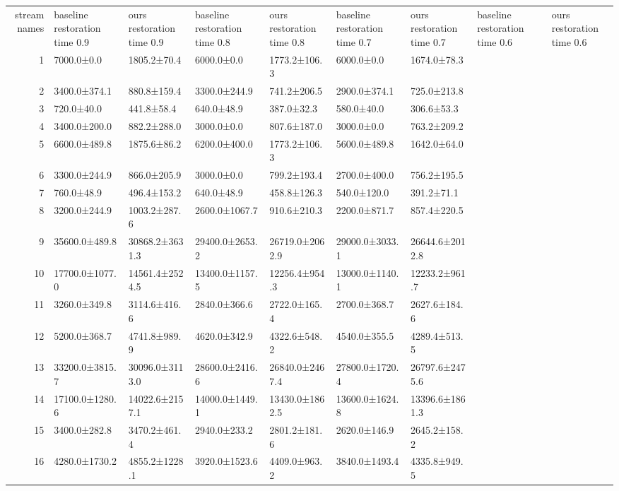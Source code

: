 \begin{tabular}{|r|l|l|l|l|l|l|l|l|}
  \hline
  stream names & baseline restoration time 0.9 & ours restoration time 0.9 & baseline restoration time 0.8 & ours restoration time 0.8 & baseline restoration time 0.7 & ours restoration time 0.7 & baseline restoration time 0.6 & ours restoration time 0.6 \\ 
  1 & 7000.0±0.0 & 1805.2±70.4 & 6000.0±0.0 & 1773.2±106.3 & 6000.0±0.0 & 1674.0±78.3 \\ 
  2 & 3400.0±374.1 & 880.8±159.4 & 3300.0±244.9 & 741.2±206.5 & 2900.0±374.1 & 725.0±213.8 \\ 
  3 & 720.0±40.0 & 441.8±58.4 & 640.0±48.9 & 387.0±32.3 & 580.0±40.0 & 306.6±53.3 \\ 
  4 & 3400.0±200.0 & 882.2±288.0 & 3000.0±0.0 & 807.6±187.0 & 3000.0±0.0 & 763.2±209.2 \\ 
  5 & 6600.0±489.8 & 1875.6±86.2 & 6200.0±400.0 & 1773.2±106.3 & 5600.0±489.8 & 1642.0±64.0 \\ 
  6 & 3300.0±244.9 & 866.0±205.9 & 3000.0±0.0 & 799.2±193.4 & 2700.0±400.0 & 756.2±195.5 \\ 
  7 & 760.0±48.9 & 496.4±153.2 & 640.0±48.9 & 458.8±126.3 & 540.0±120.0 & 391.2±71.1 \\ 
  8 & 3200.0±244.9 & 1003.2±287.6 & 2600.0±1067.7 & 910.6±210.3 & 2200.0±871.7 & 857.4±220.5 \\ 
  9 & 35600.0±489.8 & 30868.2±3631.3 & 29400.0±2653.2 & 26719.0±2062.9 & 29000.0±3033.1 & 26644.6±2012.8 \\ 
  10 & 17700.0±1077.0 & 14561.4±2524.5 & 13400.0±1157.5 & 12256.4±954.3 & 13000.0±1140.1 & 12233.2±961.7 \\ 
  11 & 3260.0±349.8 & 3114.6±416.6 & 2840.0±366.6 & 2722.0±165.4 & 2700.0±368.7 & 2627.6±184.6 \\ 
  12 & 5200.0±368.7 & 4741.8±989.9 & 4620.0±342.9 & 4322.6±548.2 & 4540.0±355.5 & 4289.4±513.5 \\ 
  13 & 33200.0±3815.7 & 30096.0±3113.0 & 28600.0±2416.6 & 26840.0±2467.4 & 27800.0±1720.4 & 26797.6±2475.6 \\ 
  14 & 17100.0±1280.6 & 14022.6±2157.1 & 14000.0±1449.1 & 13430.0±1862.5 & 13600.0±1624.8 & 13396.6±1861.3 \\ 
  15 & 3400.0±282.8 & 3470.2±461.4 & 2940.0±233.2 & 2801.2±181.6 & 2620.0±146.9 & 2645.2±158.2 \\ 
  16 & 4280.0±1730.2 & 4855.2±1228.1 & 3920.0±1523.6 & 4409.0±963.2 & 3840.0±1493.4 & 4335.8±949.5 \\ 

\end{tabular}
